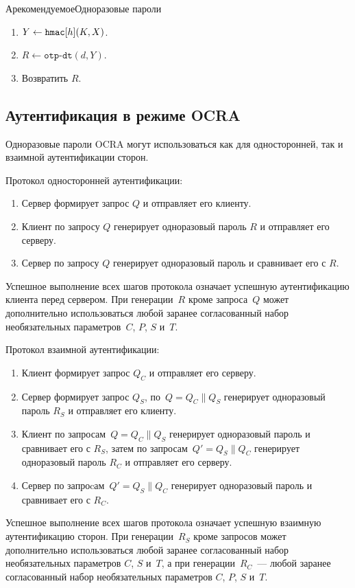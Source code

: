 \begin{appendix}{А}{рекомендуемое}{Одноразовые пароли}
\begin{enumerate}
\item
$Y\leftarrow\texttt{hmac}[h](K,X)$.

\item
$R\leftarrow\texttt{otp-dt}(d, Y)$.

\item
Возвратить $R$.
\end{enumerate}

\subsection{Аутентификация в режиме OCRA}\label{OTP.Auth}

Одноразовые пароли OCRA могут использоваться как для
односторонней, так и взаимной аутентификации сторон.

Протокол односторонней аутентификации:
\begin{enumerate}
\item 
Сервер формирует запрос $Q$ и отправляет его клиенту.

\item 
Клиент по запросу $Q$ генерирует одноразовый пароль $R$
и отправляет его серверу.

\item 
Сервер по запросу $Q$ генерирует 
одноразовый пароль и сравнивает его с $R$.
\end{enumerate}

Успешное выполнение всех шагов протокола означает 
успешную аутентификацию клиента перед сервером.
%
При генерации~$R$ кроме запроса~$Q$ 
может дополнительно использоваться любой заранее 
согласованный набор необязательных параметров~$C$, $P$, $S$ и~$T$.

Протокол взаимной аутентификации:
\begin{enumerate}
\item  
Клиент формирует запрос $Q_C$ и отправляет его серверу.

\item 
Сервер формирует запрос $Q_S$,
по~$Q=Q_C \parallel Q_S$ генерирует одноразовый пароль $R_S$
и отправляет его клиенту.

\item 
Клиент по запросам~$Q=Q_C \parallel Q_S$ генерирует 
одноразовый пароль и сравнивает его с $R_S$,
затем по запросам~$Q'=Q_S \parallel Q_C$ генерирует
одноразовый пароль $R_C$ и отправляет его серверу.

\item 
Сервер по запроcам~$Q'=Q_S \parallel Q_C$ генерирует 
одноразовый пароль и сравнивает его с $R_C$.
\end{enumerate}

Успешное выполнение всех шагов протокола означает 
успешную взаимную аутентификацию сторон.
При генерации~$R_S$ кроме запросов
может дополнительно использоваться любой заранее согласованный 
набор необязательных параметров $C$, $S$ и~$T$, 
а при генерации~$R_C$~---  любой заранее согласованный 
набор необязательных параметров $C$, $P$, $S$ и~$T$.


\end{appendix}
